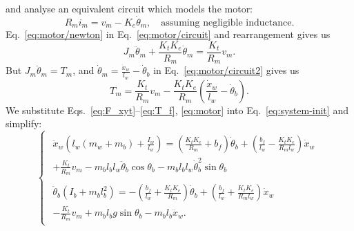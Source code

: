 \documentclass[11pt]{article} %
\begin{document}
and analyse an equivalent circuit which models the motor:
\begin{equation}\label{eq:motor/circuit}
R_m i_m = v_m - K_e \dot{\theta}_m, \quad \text{assuming negligible inductance.}
\end{equation}
Eq.~\eqref{eq:motor/newton} in Eq.~\eqref{eq:motor/circuit} and rearrangement gives us
\begin{equation}\label{eq:motor/circuit2}
  J_m \ddot{\theta}_m
  + \frac{K_t K_e}{R_m} \dot{\theta}_m
  = \frac{K_t}{R_m}v_m.
\end{equation}
But $J_m \ddot{\theta}_m = T_m$, and $\dot{\theta}_m = \frac{\dot{x}_w}{l_w} - \dot{\theta}_b$ in Eq.~\eqref{eq:motor/circuit2} gives us
\begin{equation}\label{eq:motor}
  T_m = \frac{K_t}{R_m}v_m -
  \frac{K_t K_e}{R_m}\left(
    \frac{\dot{x}_w}{l_w}
    - \dot{\theta}_b
  \right).
\end{equation}
We substitute Eqs.~\eqref{eq:F_xyt}--\eqref{eq:T_f}, \eqref{eq:motor} into Eq.~\eqref{eq:system-init} and simplify:
\begin{equation}\label{eq:system}
  \begin{cases}
    \begin{aligned}
      \ddot{x}_w\left(l_w(m_w + m_b) + \frac{I_w}{l_w}\right) =
      \left(
        \frac{K_t K_e}{R_m}
        + b_f
      \right)\dot{\theta}_b
      +
      \left(
        \frac{b_f}{l_w}
        -
        \frac{K_t K_e}{R_m l_w}
      \right)\dot{x}_w
      \\
      + \frac{K_t}{R_m}v_m
      - m_b l_b l_w \ddot{\theta}_b \cos\theta_b
      - m_b l_b l_w \dot{\theta}_b^2 \sin\theta_b
    \end{aligned}\\[2.5em]
    \begin{aligned}
      \ddot{\theta}_b\left(I_b + m_b l_b^2\right)
      =
      -\left(
        \frac{b_f}{l_w}
        +
        \frac{K_t K_e}{R_m}
      \right)\dot{\theta}_b
      + \left(
        \frac{b_f}{l_w} + \frac{K_t K_e}{R_m l_w}
      \right)\dot{x}_w
      \\
      - \frac{K_t}{R_m}v_m
      + m_b l_b g \sin\theta_b
      - m_b l_b \ddot{x}_w.
    \end{aligned}
  \end{cases}
\end{equation}
\end{document}
